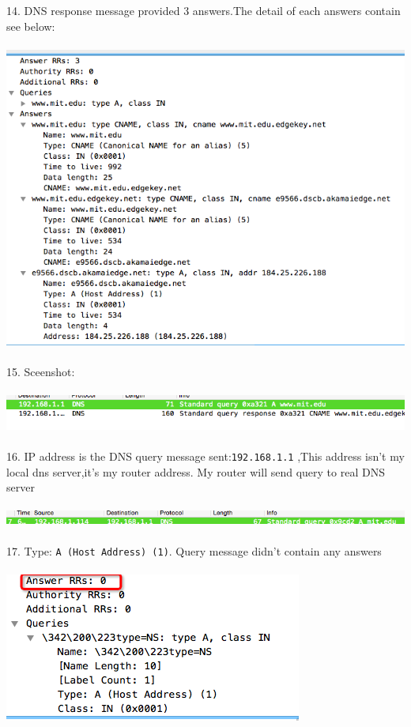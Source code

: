 \documentclass[a4paper]{article}
\begin{document}
{	14. DNS response message provided 3 answers.The detail of each answers contain see below:\\\\
	{\centering\includegraphics[scale=0.5]{Illustrations/14.png}}\\\\
	15. Sceenshot: \\\\
	{\centering\includegraphics[scale=0.5]{Illustrations/15.png}}\\\\
	16. IP address is the DNS query message sent:\verb|192.168.1.1| ,This address isn't my local dns server,it's my router address.
	My router will send query to real DNS server\\\\
	{\centering\includegraphics[scale=0.5]{Illustrations/16.png}}\\\\
	17. Type: \verb|A (Host Address) (1)|. Query message didn't contain any answers\\\\
	{\centering\includegraphics[scale=0.5]{Illustrations/17.png}}\\\\
}
\end{document}

